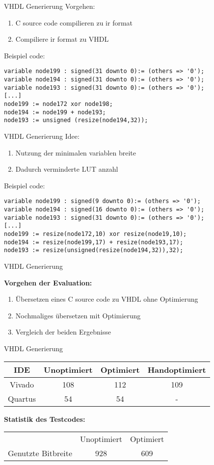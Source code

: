 
\begin{frame}[fragile]{VHDL Generierung}
Vorgehen:
\begin{enumerate}
	\item C source code compilieren zu ir format
	\item Compiliere ir format zu VHDL
\end{enumerate}

Beispiel code:
\begin{lstlisting}
variable node199 : signed(31 downto 0):= (others => '0'); 
variable node194 : signed(31 downto 0):= (others => '0'); 
variable node193 : signed(31 downto 0):= (others => '0'); 
[...]
node199 := node172 xor node198;
node194 := node199 + node193;
node193 := unsigned (resize(node194,32));
\end{lstlisting}
\end{frame}

\begin{frame}[fragile]{VHDL Generierung}
Idee:
\begin{enumerate}
	\item Nutzung der minimalen variablen breite
	\item Dadurch verminderte LUT anzahl
\end{enumerate}

Beispiel code:
\begin{lstlisting}
variable node199 : signed(9 downto 0):= (others => '0'); 
variable node194 : signed(16 downto 0):= (others => '0'); 
variable node193 : signed(31 downto 0):= (others => '0'); 
[...]
node199 := resize(node172,10) xor resize(node19,10);	
node194 := resize(node199,17) + resize(node193,17);	
node193 := resize(unsigned(resize(node194,32)),32);	
\end{lstlisting}
\end{frame}

\begin{frame}{VHDL Generierung}

\textbf{Vorgehen der Evaluation:}
\begin{enumerate}
	\item Übersetzen eines C source code zu VHDL ohne Optimierung
	\item Nochmaliges übersetzen mit Optimierung
	\item Vergleich der beiden Ergebnisse
\end{enumerate}
\end{frame}

\begin{frame}{VHDL Generierung}
\begin{tabular}{c | c | c | c}
	IDE    & Unoptimiert & Optimiert & Handoptimiert \\
	\hline
	Vivado & 108 & 112 & 109 \\
	Quartus & 54 & 54 & - \\
\end{tabular}
\textbf{Statistik des Testcodes:} \newline
\begin{tabular}{ c c c }
	& Unoptimiert & Optimiert \\
	Genutzte Bitbreite & 928 & 609 \\
\end{tabular}
\end{frame}
